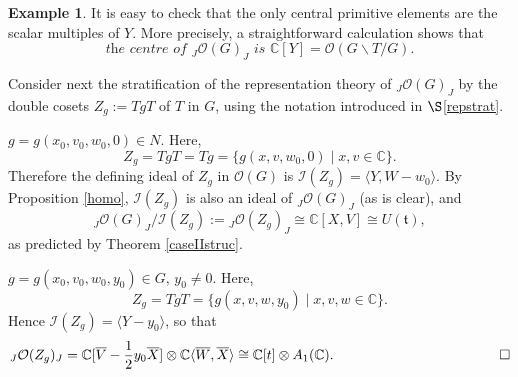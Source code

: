 \documentclass{amsart}
\numberwithin{equation}{section}
\theoremstyle{definition}
\newtheorem{example}[theorem]{Example}
\begin{document}
\begin{example}
It is easy to check that the only central primitive elements are the scalar multiples of $Y$. More precisely, a straightforward calculation shows that 
$$ \textit{the centre  of }{}_J\mathcal{O}(G)_J \textit{ is }\mathbb{C}[Y] = \mathcal{O}(G\backslash T/G).$$

Consider next the stratification of the representation theory of ${}_J \mathcal{O}(G)_J$ by the double cosets $Z_g :=TgT$ of $T$ in $G$, using  the notation introduced in $\S$\ref{repstrat}. 
\medskip

 $g = g(x_0,v_0,w_0,0) \in N$. Here,  
$$ Z_g=TgT=Tg = \{g(x,v,w_0,0) \mid x,v \in \mathbb{C} \}. $$
Therefore the defining ideal of $Z_g$ in $\mathcal{O}(G)$ is $ \mathcal{I}(Z_g) = \langle Y, W - w_0 \rangle$. By Proposition \ref{homo}, $\mathcal{I}(Z_g)$ is also an ideal of ${}_J \mathcal{O}(G)_J$ (as is clear), and 
$${}_J \mathcal{O}(G)_J/\mathcal{I}(Z_g):= {}_J \mathcal{O}(Z_g)_J\cong \mathbb{C}[X,V] \cong  U(\mathfrak{t}), $$
as predicted by Theorem \ref{caseIIstruc}.
\medskip

 $g = g(x_0,v_0, w_0,y_0) \in G, \, y_0 \neq 0$. Here,
$$ Z_g = TgT = \{g(x,v,w,y_0)\mid x,v,w \in \mathbb{C} \}.$$
Hence $ \mathcal{I}(Z_g)=\langle Y - y_0 \rangle$, so that
$${}_J \mathcal{O}(Z_g)_J= \mathbb{C}[\overline{V} - \frac{1}{2}y_0\overline{X}] \otimes \mathbb{C}\langle \overline{W}, \overline{X} \rangle\cong \mathbb{C}[t] \otimes A_1(\mathbb{C}).\quad\quad\quad\quad \quad\quad\quad\quad\quad\quad\qed$$
\end{example}
\end{document}
